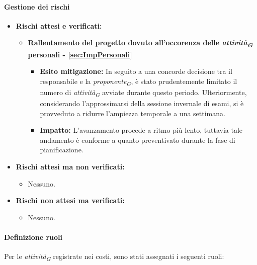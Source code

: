 \paragraph{Gestione dei rischi} 
\begin{itemize}
    \item \textbf{Rischi attesi e verificati:}
\begin{itemize}
    \item \textbf{Rallentamento del progetto dovuto all'occorenza delle \textit{attività}\textsubscript{\textit{G}} personali - \ref{sec:ImpPersonali}}
    \begin{itemize}
        \item \textbf{Esito mitigazione:} 
        In seguito a una concorde decisione tra il responsabile e la \textit{proponente}\textsubscript{\textit{G}}, è stato prudentemente limitato il numero di \textit{attività}\textsubscript{\textit{G}} avviate durante questo periodo. Ulteriormente, considerando l'approssimarsi della sessione invernale di esami, si è provveduto a ridurre l'ampiezza temporale a una settimana.
        \item \textbf{Impatto:}
        L'avanzamento procede a ritmo più lento, tuttavia tale andamento è conforme a quanto preventivato durante la fase di pianificazione.
    \end{itemize}
\end{itemize}
\item \textbf{Rischi attesi ma non verificati:}
 \begin{itemize}
    \item Nessuno.
\end{itemize}
\item \textbf{Rischi non attesi ma verificati:}
\begin{itemize}
    \item Nessuno.
\end{itemize}
\end{itemize}

\paragraph{Definizione ruoli} \hspace{1pt}
Per le \textit{attività}\textsubscript{\textit{G}} registrate nei costi, sono stati assegnati i seguenti ruoli:

